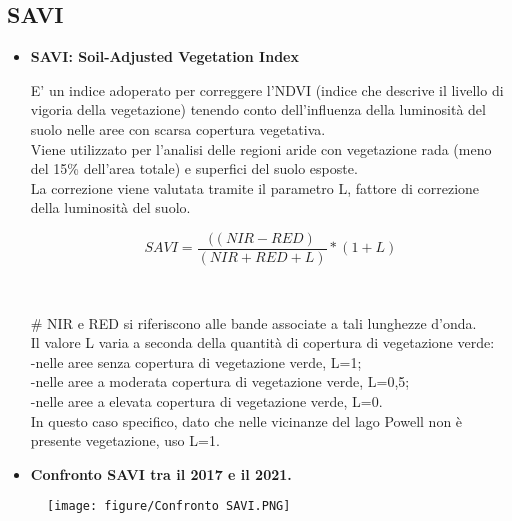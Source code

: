 \documentclass[10pt]{beamer}
\begin{document}
\subsection {SAVI}
\begin{frame}
    \begin{itemize}
      \item \textbf{SAVI: Soil-Adjusted Vegetation Index}
      \\{\scriptsize E' un indice adoperato per correggere l'NDVI (indice che descrive il livello di vigoria della vegetazione) tenendo conto dell'influenza della luminosità del suolo nelle aree con scarsa copertura vegetativa.
      \\ Viene utilizzato per l'analisi delle regioni aride con vegetazione rada (meno del 15\% dell'area totale) e superfici del suolo esposte.
      \\La correzione viene valutata tramite il parametro L, fattore di correzione della luminosità del suolo.\par} 

    \begin{equation}
       SAVI={\frac{((NIR - RED)}{(NIR + RED + L)}}*{(1+L)}
    \end{equation}

      \\{\scriptsize # NIR e RED si riferiscono alle bande associate a tali lunghezze d'onda. 
      \\Il valore L varia a seconda della quantità di copertura di vegetazione verde:
      \\-nelle aree senza copertura di vegetazione verde, L=1;
      \\-nelle aree a moderata copertura di vegetazione verde, L=0,5;
      \\-nelle aree a elevata copertura di vegetazione verde, L=0.
      \bigskip
      \\In questo caso specifico, dato che nelle vicinanze del lago Powell non è presente vegetazione, uso L=1.\par}
    \end{itemize}
\end{frame}


\begin{frame} {}
    \begin{itemize}
      \item \textbf{Confronto SAVI tra il 2017 e il 2021.}
    \end{itemize}
    \begin{figure}
      \centering
      \bigskip 
      \texttt{[image: figure/Confronto SAVI.PNG]}
    \end{figure}
\end{frame}
\end{document}
